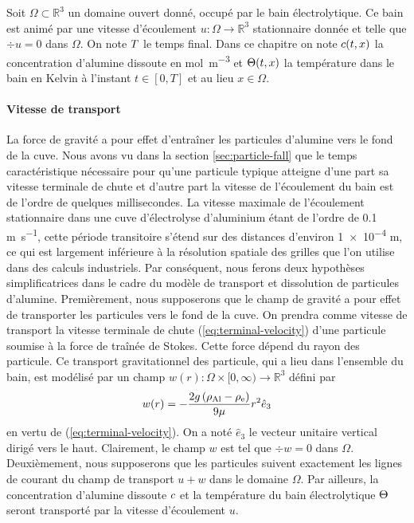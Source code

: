 Soit $\Omega\subset \mathbb R^3$ un domaine ouvert donné, occupé par
le bain électrolytique. Ce bain est animé par une vitesse d'écoulement
$u:\Omega\to\mathbb R^3$ stationnaire donnée et telle que $\div u = 0$
dans $\Omega$. On note $T$ le temps final. Dans ce chapitre on
note $c(t, x)$ la concentration d'alumine dissoute en
\si{\mol\per\cubic\meter} et $\Theta(t, x)$ la température dans
le bain en Kelvin à l'instant $t \in [0, T]$ et au lieu $x \in
\Omega$.

\paragraph{Vitesse de transport}
La force de gravité a pour effet d'entraîner les particules d'alumine
vers le fond de la cuve. Nous avons vu dans la section
\ref{sec:particle-fall} que le temps caractéristique nécessaire pour
qu'une particule typique atteigne d'une part sa vitesse terminale de
chute et d'autre part la vitesse de l'écoulement du bain est de
l'ordre de quelques millisecondes. La vitesse maximale de l'écoulement
stationnaire dans une cuve d'électrolyse d'aluminium étant de l'ordre
de \num{0.1} \si{\meter\per\second}, cette période transitoire s'étend
sur des distances d'environ \num{1e-4} \si{\meter}, ce qui est
largement inférieure à la résolution spatiale des grilles que l'on
utilise dans des calculs industriels. Par conséquent, nous ferons deux
hypothèses simplificatrices dans le cadre du modèle de transport et
dissolution de particules d'alumine. Premièrement, nous supposerons
que le champ de gravité a pour effet de transporter les particules
vers le fond de la cuve. On prendra comme vitesse de transport la
vitesse terminale de chute (\ref{eq:terminal-velocity}) d'une
particule soumise à la force de traînée de Stokes. Cette force dépend
du rayon des particule. Ce transport gravitationnel des particule, qui
a lieu dans l'ensemble du bain, est modélisé par un champ $w(r):
\Omega\times[0, \infty)\to\mathbb R^3$ défini par
\begin{equation}
  w(r) =
  -\frac{2g\left( \rho_\mathrm{Al} -
      \rho_\mathrm{e} \right)}{9\mu} r^2 \hat e_3
\end{equation}
en vertu de (\ref{eq:terminal-velocity}). On a noté $\hat e_3$ le
vecteur unitaire vertical dirigé vers le haut. Clairement, le champ
$w$ est tel que $\div w = 0$ dans $\Omega$. Deuxièmement, nous
supposerons que les particules suivent exactement les lignes de
courant du champ de transport $u + w$ dans le domaine $\Omega$. Par
ailleurs, la concentration d'alumine dissoute $c$ et la
température du bain électrolytique $\Theta$ seront transporté
par la vitesse d'écoulement $u$.

